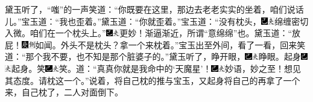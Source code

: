 黛玉听了，“嗤”的一声笑道：“你既要在这里，那边去老老实实的坐着，咱们说话儿。”宝玉道：“我也歪着。”黛玉道：“你就歪着。”宝玉道：“没有枕头，{\includegraphics[width=3mm]{../Images/00003}\includegraphics[width=3mm]{../Images/00012}\footnotesize \kaishu 绵缠密切入微。}咱们在一个枕头上。”{\includegraphics[width=3mm]{../Images/00003}\includegraphics[width=3mm]{../Images/00012}\footnotesize \kaishu 更妙！渐逼渐近，所谓“意绵绵”也。}黛玉道：“放屁！{\includegraphics[width=3mm]{../Images/00004}\includegraphics[width=3mm]{../Images/00011}\footnotesize \kaishu 如闻。}外头不是枕头？拿一个来枕着。”宝玉出至外间，看了一看，回来笑道：“那个我不要，也不知是那个脏婆子的。”黛玉听了，睁开眼，{\includegraphics[width=3mm]{../Images/00003}\includegraphics[width=3mm]{../Images/00012}\footnotesize \kaishu 睁眼。}起身{\includegraphics[width=3mm]{../Images/00003}\includegraphics[width=3mm]{../Images/00012}\footnotesize \kaishu 起身。}笑{\includegraphics[width=3mm]{../Images/00003}\includegraphics[width=3mm]{../Images/00012}\footnotesize \kaishu 笑。}道：“真真你就是我命中的‘天魔星’！{\includegraphics[width=3mm]{../Images/00003}\includegraphics[width=3mm]{../Images/00012}\footnotesize \kaishu 妙语，妙之至！想见其态度。}请枕这一个。”说着，将自己枕的推与宝玉，又起身将自己的再拿了一个来，自己枕了，二人对面倒下。

